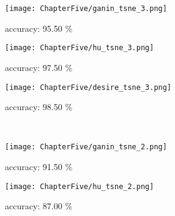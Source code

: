 \begin{figure}[ht!]
    \begin{minipage}[t!]{0.015\textwidth}
    \end{minipage}
    \begin{minipage}[t!]{0.985\textwidth}
        \captionsetup[subfigure]{labelformat=empty}
        \centering
        \begin{subfigure}{0.325\textwidth}
            \centering
            \texttt{[image: ChapterFive/ganin\_tsne\_3.png]}
            \caption{accuracy: 95.50 \%}
        \end{subfigure}
        \hfill
        \begin{subfigure}{0.325\textwidth}
            \centering
            \texttt{[image: ChapterFive/hu\_tsne\_3.png]}
            \caption{accuracy: 97.50 \%}
        \end{subfigure}
        \hfill
        \begin{subfigure}{0.325\textwidth}
            \centering
            \texttt{[image: ChapterFive/desire\_tsne\_3.png]}
            \caption{accuracy: 98.50 \%}
        \end{subfigure}
    \end{minipage}
    \\ \vspace{0.5 cm}
    \begin{minipage}[t!]{0.015\textwidth}
    \end{minipage}
    \begin{minipage}[t!]{0.985\textwidth}
        \captionsetup[subfigure]{labelformat=empty}
        \begin{subfigure}{0.325\textwidth}
            \centering
            \texttt{[image: ChapterFive/ganin\_tsne\_2.png]}
            \caption{accuracy: 91.50 \%}
        \end{subfigure}
        \hfill
        \begin{subfigure}{0.325\textwidth}
            \centering
            \texttt{[image: ChapterFive/hu\_tsne\_2.png]}
            \caption{accuracy: 87.00 \%}
        \end{subfigure}
        \hfill
        \begin{subfigure}{0.325\textwidth}

\end{subfigure}
\end{minipage}
\end{figure}
